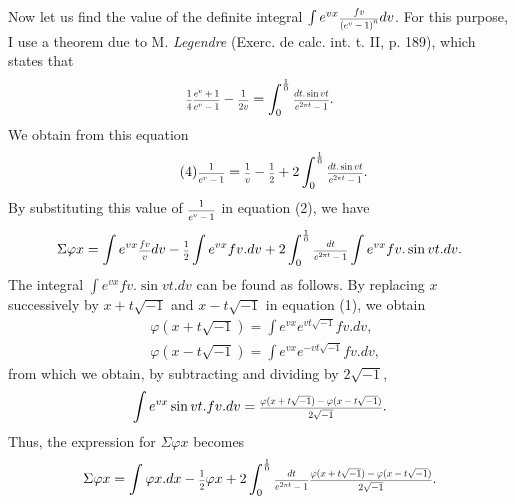 \documentclass[oneside, 12 pt, leqno]{memoir}
\let\oldfrac\frac
\def\frac#1#2{\mathchoice{\text{\scalebox{.83}{${\oldfrac{#1}{#2}}$}}}{\text{\scalebox{.83}{${\displaystyle\oldfrac{#1}{#2}}$}}}{\genfrac{}{}{}{2}{#1}{#2}}{\genfrac{}{}{}{3}{#1}{#2}}}
\begin{document}
Now let us find the value of the definite integral \(\int e^{v x} \frac{f v}{\left(e^v-1\right)^n} d v\). For this purpose, I use a theorem due to M. \textit{Legendre} (Exerc. de calc. int. t. II, p. 189), which states that
\[\frac{1}{4} \frac{e^v+1}{e^v-1}-\frac{1}{2 v}=\int_0^{\frac{1}{0}} \frac{d t. \sin v t}{e^{2 \pi t}-1}.\]
We obtain from this equation
\[\tag{4} \frac{1}{e^v-1}=\frac{1}{v}-\frac{1}{2}+2 \int_0^{\frac{1}{0}} \frac{d t. \sin v t}{e^{2 \pi t}-1}.\]
By substituting this value of \(\frac{1}{e^v-1}\) in equation (2), we have
\[\Sigma \varphi x=\int e^{v x} \frac{f v}{v} d v-\frac{1}{2} \int e^{v x} f v. d v+2 \int_0^{\frac{1}{0}} \frac{d t}{e^{2 \pi t}-1} \int e^{v x} f v. \sin v t. d v.\]
The integral \(\int e^{v x} f v. \sin v t. d v\) can be found as follows. By replacing \(x\) successively by \(x+t \sqrt{-1}\) and \(x-t \sqrt{-1}\) in equation (1), we obtain
\[\begin{aligned}
& \varphi(x+t \sqrt{-1})=\int e^{v x} e^{v t \sqrt{-1}} f v. d v, \\
& \varphi(x-t \sqrt{-1})=\int e^{v x} e^{-v t \sqrt{-1}} f v. d v,
\end{aligned}\]
from which we obtain, by subtracting and dividing by \(2 \sqrt{-1}\),
\[\int e^{v x} \sin v t. f v. d v=\frac{\varphi(x+t \sqrt{-1})-\varphi(x-t \sqrt{-1})}{2 \sqrt{-1}}.\]
Thus, the expression for \(\Sigma \varphi x\) becomes
\[\Sigma \varphi x=\int \varphi x. d x-\frac{1}{2} \varphi x+2 \int_0^{\frac{1}{0}} \frac{d t}{e^{2 \pi t}-1} \frac{\varphi(x+t \sqrt{-1})-\varphi(x-t \sqrt{-1})}{2 \sqrt{-1}}.\]
\end{document}
